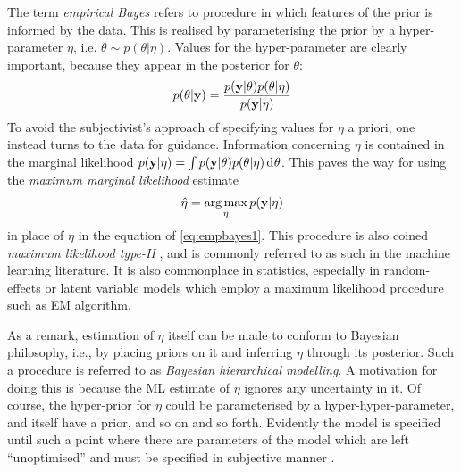 The term \emph{empirical Bayes} \citep{robbins1956empirical,casella1985introduction} refers to procedure in which features of the prior is informed by the data.
This is realised by parameterising the prior by a hyper-parameter $\eta$, i.e. $\theta \sim p(\theta|\eta)$.
Values for the hyper-parameter are clearly important, because they appear in the posterior for $\theta$: 
\begin{equation}\label{eq:empbayes1}
  p(\theta|{\mathbf y}) = \frac{p({\mathbf y}|\theta)p(\theta|\eta)}{p({\mathbf y}|\eta)} 
\end{equation}
To avoid the subjectivist's approach of specifying values for $\eta$ a priori, one instead turns to the data for guidance.
Information concerning $\eta$ is contained in the marginal likelihood $p({\mathbf y}|\eta) = \int p({\mathbf y}|\theta)p(\theta|\eta) \operatorname{d}\hspace{0.5pt}\! \theta$.
This paves the way for using the \emph{maximum marginal likelihood} estimate
\begin{equation}
  \hat\eta = \operatorname*{arg\,max}_\eta p({\mathbf y}|\eta) 
\end{equation}
in place of $\eta$ in the equation of \cref{eq:empbayes1}.
This procedure is also coined \emph{maximum likelihood type-II} \citep{bishop2006pattern}, and is commonly referred to as such in the machine learning literature. 
It is also commonplace in statistics, especially in random-effects or latent variable models which employ a maximum likelihood procedure such as EM algorithm.

As a remark, estimation of $\eta$ itself can be made to conform to Bayesian philosophy, i.e., by placing priors on it and inferring $\eta$ through its posterior.
Such a procedure is referred to as \emph{Bayesian hierarchical modelling}.
A motivation for doing this is because the ML estimate of $\eta$ ignores any uncertainty in it.
Of course, the hyper-prior for $\eta$ could be parameterised by a hyper-hyper-parameter, and itself have a prior, and so on and so forth.
Evidently the model is specified until such a point where there are parameters of the model which are left ``unoptimised'' and must be specified in subjective manner \citep{beal2003variational}.